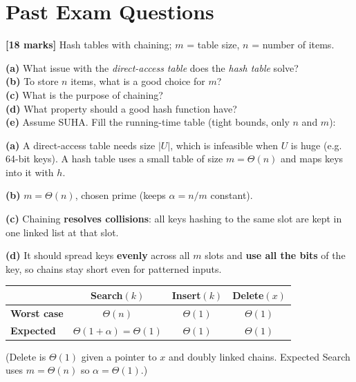 \documentclass[11pt]{article}
\begin{document}
\section{Past Exam Questions}

\begin{exambox}
\textbf{[18 marks]} Hash tables with chaining; $m$ = table size, $n$ = number of items.

\textbf{(a)} What issue with the \textit{direct-access table} does the \textit{hash table} solve?\\
\textbf{(b)} To store $n$ items, what is a good choice for $m$?\\
\textbf{(c)} What is the purpose of chaining?\\
\textbf{(d)} What property should a good hash function have?\\
\textbf{(e)} Assume SUHA. Fill the running-time table (tight bounds, only $n$ and $m$):

\begin{answerband}
\textbf{(a)} A direct-access table needs size $|U|$, which is infeasible when $U$ is huge (e.g. 64-bit keys). A hash table uses a small table of size $m = \Theta(n)$ and maps keys into it with $h$.

\textbf{(b)} $m = \Theta(n)$, chosen prime (keeps $\alpha = n/m$ constant).

\textbf{(c)} Chaining \textbf{resolves collisions}: all keys hashing to the same slot are kept in one linked list at that slot.

\textbf{(d)} It should spread keys \textbf{evenly} across all $m$ slots and \textbf{use all the bits} of the key, so chains stay short even for patterned inputs.

\smallskip
\renewcommand{\arraystretch}{1.5}
\begin{tabular}{l c c c}
\hline
 & \textbf{Search}$(k)$ & \textbf{Insert}$(k)$ & \textbf{Delete}$(x)$\\
\hline
\textbf{Worst case} & \textcolor{rustW}{$\Theta(n)$} & \textcolor{greenO}{$\Theta(1)$} & \textcolor{greenO}{$\Theta(1)$}\\
\textbf{Expected} & \textcolor{greenO}{$\Theta(1 + \alpha) = \Theta(1)$} & \textcolor{greenO}{$\Theta(1)$} & \textcolor{greenO}{$\Theta(1)$}\\
\hline
\end{tabular}
\smallskip

(Delete is $\Theta(1)$ given a pointer to $x$ and doubly linked chains. Expected Search uses $m = \Theta(n)$ so $\alpha = \Theta(1)$.)
\end{answerband}
\end{exambox}
\end{document}
